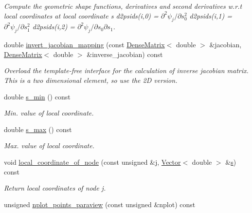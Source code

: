 \begin{DoxyCompactItemize}
\begin{DoxyCompactList}\small\item\em Compute the geometric shape functions, derivatives and second derivatives w.\+r.\+t local coordinates at local coordinate s d2psids(i,0) = $ \partial^2 \psi_j / \partial s_0^2 $ d2psids(i,1) = $ \partial^2 \psi_j / \partial s_1^2 $ d2psids(i,2) = $ \partial^2 \psi_j / \partial s_0 \partial s_1 $. \end{DoxyCompactList}\item 
double \hyperlink{classoomph_1_1TElement_3_012_00_01NNODE__1D_01_4_a80334f2ec7d9f8795b9e260d185194d3}{invert\+\_\+jacobian\+\_\+mapping} (const \hyperlink{classoomph_1_1DenseMatrix}{Dense\+Matrix}$<$ double $>$ \&jacobian, \hyperlink{classoomph_1_1DenseMatrix}{Dense\+Matrix}$<$ double $>$ \&inverse\+\_\+jacobian) const
\begin{DoxyCompactList}\small\item\em Overload the template-\/free interface for the calculation of inverse jacobian matrix. This is a two dimensional element, so use the 2D version. \end{DoxyCompactList}\item 
double \hyperlink{classoomph_1_1TElement_3_012_00_01NNODE__1D_01_4_a16749c4131f12c3723eb28a201370768}{s\+\_\+min} () const
\begin{DoxyCompactList}\small\item\em Min. value of local coordinate. \end{DoxyCompactList}\item 
double \hyperlink{classoomph_1_1TElement_3_012_00_01NNODE__1D_01_4_a5e7b1d34547ad697dd89e73944e5bfd1}{s\+\_\+max} () const
\begin{DoxyCompactList}\small\item\em Max. value of local coordinate. \end{DoxyCompactList}\item 
void \hyperlink{classoomph_1_1TElement_3_012_00_01NNODE__1D_01_4_acf3c8a84331e4ff80a9b270124a2730b}{local\+\_\+coordinate\+\_\+of\+\_\+node} (const unsigned \&j, \hyperlink{classoomph_1_1Vector}{Vector}$<$ double $>$ \&\hyperlink{cfortran_8h_ab7123126e4885ef647dd9c6e3807a21c}{s}) const
\begin{DoxyCompactList}\small\item\em Return local coordinates of node j. \end{DoxyCompactList}\item 
unsigned \hyperlink{classoomph_1_1TElement_3_012_00_01NNODE__1D_01_4_a4f82b26b291f8d00592e48729c8f5bfb}{nplot\+\_\+points\+\_\+paraview} (const unsigned \&nplot) const

\end{DoxyCompactItemize}
